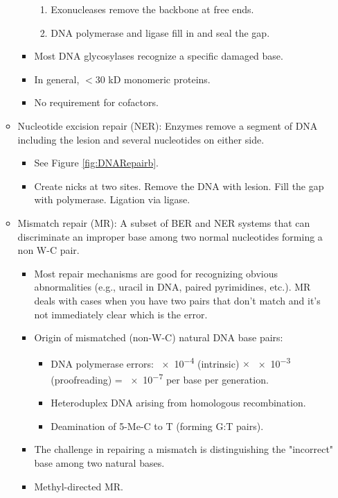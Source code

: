 \documentclass[../notes.tex]{subfiles}
\begin{document}
\begin{itemize}
\begin{itemize}
\begin{itemize}
\begin{enumerate}
                \item Exonucleases remove the backbone at free ends.
                \item DNA polymerase and ligase fill in and seal the gap.
            \end{enumerate}
            \item Most DNA glycosylases recognize a specific damaged base.
            \item In general, $<30$ kD monomeric proteins.
            \item No requirement for cofactors.
        \end{itemize}
        \item Nucleotide excision repair (NER): Enzymes remove a segment of DNA including the lesion and several nucleotides on either side.
        \begin{itemize}
            \item See Figure \ref{fig:DNARepairb}.
            \item Create nicks at two sites. Remove the DNA with lesion. Fill the gap with polymerase. Ligation via ligase.
        \end{itemize}
        \item Mismatch repair (MR): A subset of BER and NER systems that can discriminate an improper base among two normal nucleotides forming a non W-C pair.
        \begin{itemize}
            \item Most repair mechanisms are good for recognizing obvious abnormalities (e.g., uracil in DNA, paired pyrimidines, etc.). MR deals with cases when you have two pairs that don't match and it's not immediately clear which is the error.
            \item Origin of mismatched (non-W-C) natural DNA base pairs:
            \begin{itemize}
                \item DNA polymerase errors: \num{e-4} (intrinsic) $\times$ \num{e-3} (proofreading) = \num{e-7} per base per generation.
                \item Heteroduplex DNA arising from homologous recombination.
                \item Deamination of 5-Me-C to T (forming G:T pairs).
            \end{itemize}
            \item The challenge in repairing a mismatch is distinguishing the "incorrect" base among two natural bases.
            \item Methyl-directed MR.

\end{itemize}
\end{itemize}
\end{itemize}
\end{document}
